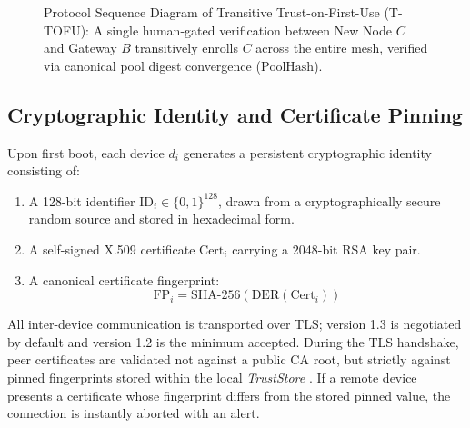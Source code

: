 \documentclass[conference,a4paper]{IEEEtran}
\begin{document}
\begin{figure}[t]
\caption{Protocol Sequence Diagram of Transitive Trust-on-First-Use (T-TOFU): A single human-gated verification between New Node $C$ and Gateway $B$ transitively enrolls $C$ across the entire mesh, verified via canonical pool digest convergence ($\text{PoolHash}$).}
\label{fig:protocol_flow}
\end{figure}

\subsection{Cryptographic Identity and Certificate Pinning}
Upon first boot, each device $d_i$ generates a persistent cryptographic identity consisting of:
\begin{enumerate}
    \item A 128-bit identifier $\text{ID}_i \in \{0,1\}^{128}$, drawn from a cryptographically secure random source and stored in hexadecimal form.
    \item A self-signed X.509 certificate $\text{Cert}_i$ carrying a 2048-bit RSA key pair.
    \item A canonical certificate fingerprint:
    \begin{equation}
        \text{FP}_i = \text{SHA-256}(\text{DER}(\text{Cert}_i))
    \end{equation}
\end{enumerate}
All inter-device communication is transported over TLS; version 1.3 \cite{rfc8446} is negotiated by default and version 1.2 is the minimum accepted. During the TLS handshake, peer certificates are validated not against a public CA root, but strictly against pinned fingerprints stored within the local \textit{TrustStore} \cite{pradeep2022pinning}. If a remote device presents a certificate whose fingerprint differs from the stored pinned value, the connection is instantly aborted with an alert.
\end{document}
